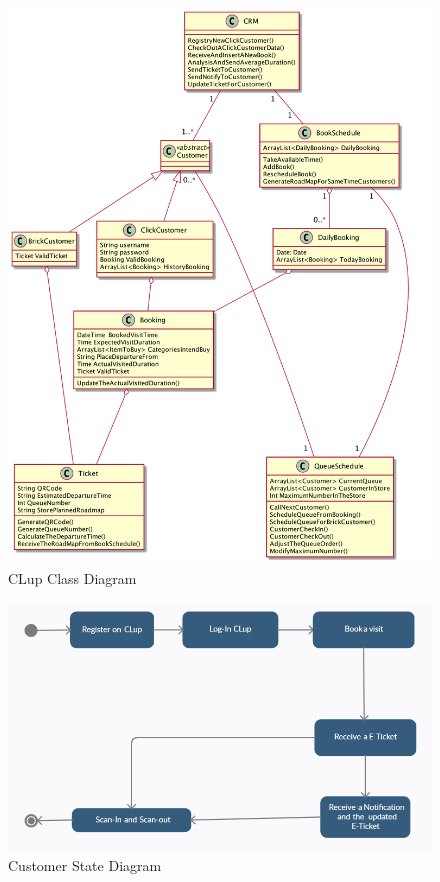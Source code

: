 \documentclass[a4paper,12pt]{report}
\begin{document}
\begin{figure}[H] 
	\centering
	\includegraphics[scale=0.3]{class_diagram.png}
	\caption{CLup Class Diagram}
	\label{Class Diagram}
\end{figure}

\begin{figure}[H]  
	\centering 
	\includegraphics[scale=0.62]{State_diagram1.png}
	\caption{Customer State Diagram}
	\centering
	\label{State Diagram 1}
\end{figure}
\end{document}
